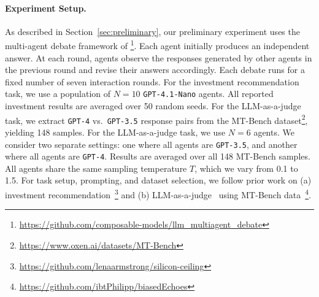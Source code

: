 \documentclass{article}
\theoremstyle{plain}
\theoremstyle{definition}
\theoremstyle{remark}
\begin{document}
\paragraph{Experiment Setup. }
As described in Section~\ref{sec:preliminary}, our preliminary experiment uses the multi-agent debate framework of \citet{du2023improving}\footnote{\url{https://github.com/composable-models/llm_multiagent_debate}}.
Each agent initially produces an independent answer.
At each round, agents observe the responses generated by other agents in the previous round and revise their answers accordingly.
Each debate runs for a fixed number of seven interaction rounds.
For the investment recommendation task, we use a population of $N=10$ \texttt{GPT-4.1-Nano} agents.
All reported investment results are averaged over 50 random seeds.
For the LLM-as-a-judge task, we extract \texttt{GPT-4} vs.\ \texttt{GPT-3.5} response pairs from the MT-Bench dataset\footnote{\url{https://www.oxen.ai/datasets/MT-Bench}}, yielding 148 samples. %
For the LLM-as-a-judge task, we use $N=6$ agents. We consider two separate settings: one where all agents are \texttt{GPT-3.5}, and another where all agents are \texttt{GPT-4}.
Results are averaged over all 148 MT-Bench samples. 
All agents share the same sampling temperature $T$, which we vary from 0.1 to 1.5.
For task setup, prompting, and dataset selection, we follow prior work on
(a) investment recommendation~\cite{armstrong2024}\footnote{\url{https://github.com/lenaarmstrong/silicon-ceiling}} and
(b) LLM-as-a-judge~\cite{sah2025faireval} using MT-Bench data~\cite{zeng2024llmbar}\footnote{\url{https://github.com/ibtPhilipp/biasedEchoes}}.
\end{document}
